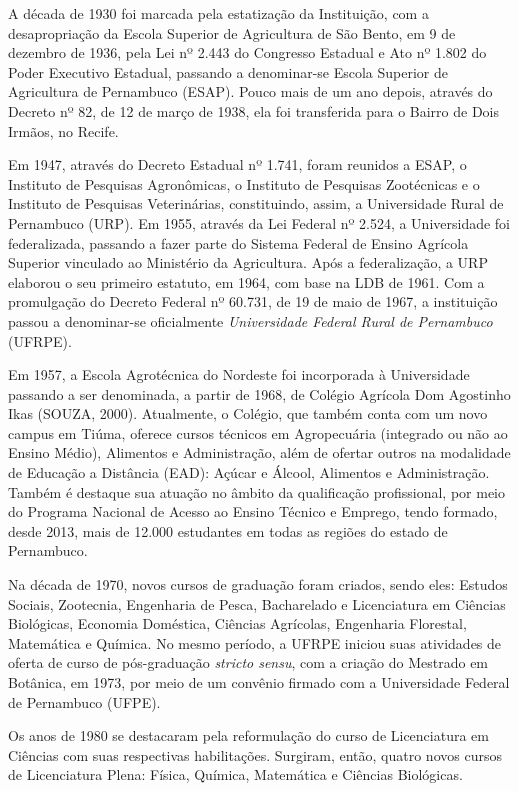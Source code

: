 \documentclass[
	12pt,				%
	openright,			%
  oneside,     %
	a4paper,			%
	chapter=TITLE,		%
	english,			%
	french,				%
	spanish,			%
	brazil				%
	]{abntex2}
\begin{document}
A década de 1930 foi marcada pela estatização da Instituição, com a desapropriação da Escola Superior de Agricultura de São Bento, em 9 de dezembro de 1936, pela Lei nº 2.443 do Congresso Estadual e Ato nº 1.802 do Poder Executivo Estadual, passando a denominar-se Escola Superior de Agricultura de Pernambuco (ESAP). Pouco mais de um ano depois, através do Decreto nº 82, de 12 de março de 1938, ela foi transferida para o Bairro de Dois Irmãos, no Recife.

Em 1947, através do Decreto Estadual nº 1.741, foram reunidos a ESAP, o Instituto de Pesquisas Agronômicas, o Instituto de Pesquisas Zootécnicas e o Instituto de Pesquisas Veterinárias, constituindo, assim, a Universidade Rural de Pernambuco (URP). Em 1955, através da Lei Federal nº 2.524, a Universidade foi federalizada, passando a fazer parte do Sistema Federal de Ensino Agrícola Superior vinculado ao Ministério da Agricultura. Após a federalização, a URP elaborou o seu primeiro estatuto, em 1964, com base na LDB de 1961. Com a promulgação do Decreto Federal nº 60.731, de 19 de maio de 1967, a instituição passou a denominar-se oficialmente \textit{Universidade Federal Rural de Pernambuco} (UFRPE).

Em 1957, a Escola Agrotécnica do Nordeste foi incorporada à Universidade passando a ser denominada, a partir de 1968, de Colégio Agrícola Dom Agostinho Ikas (SOUZA, 2000). Atualmente, o Colégio, que também conta com um novo campus em Tiúma, oferece cursos técnicos em Agropecuária (integrado ou não ao Ensino Médio), Alimentos e Administração, além de ofertar outros na modalidade de Educação a Distância (EAD): Açúcar e Álcool, Alimentos e Administração. Também é destaque sua atuação no âmbito da qualificação profissional, por meio do Programa Nacional de Acesso ao Ensino Técnico e Emprego, tendo formado, desde 2013, mais de 12.000 estudantes em todas as regiões do estado de Pernambuco.

Na década de 1970, novos cursos de graduação foram criados, sendo eles: Estudos Sociais, Zootecnia, Engenharia de Pesca, Bacharelado e Licenciatura em Ciências Biológicas, Economia Doméstica, Ciências Agrícolas, Engenharia Florestal, Matemática e Química. No mesmo período, a UFRPE iniciou suas atividades de oferta de curso de pós-graduação \textit{stricto sensu}, com a criação do Mestrado em Botânica, em 1973, por meio de um convênio firmado com a Universidade Federal de Pernambuco (UFPE).

Os anos de 1980 se destacaram pela reformulação do curso de Licenciatura em Ciências com suas respectivas habilitações. Surgiram, então, quatro novos cursos de Licenciatura Plena: Física, Química, Matemática e Ciências Biológicas.
\end{document}

